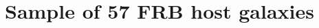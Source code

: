 \documentclass[apjl, linenumbers]{aastex701}
\begin{document}
\title{Sample of 57 FRB host galaxies}

\author{}
\affiliation{}
\email{}





\end{document}
